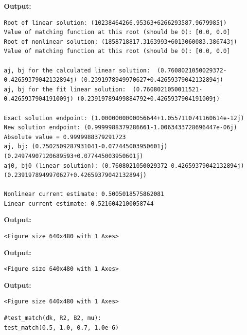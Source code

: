 \documentclass{article}
\begin{document}
\textbf{Output:}\begin{verbatim}
Root of linear solution: (10238464266.95363+6266293587.9679985j)
Value of matching function at this root (should be 0): [0.0, 0.0]
Root of nonlinear solution: (1858718817.3163993+6013060083.386743j)
Value of matching function at this root (should be 0): [0.0, 0.0]

aj, bj for the calculated linear solution:  (0.7608021050029372-0.42659379042132894j) (0.2391978949970627+0.42659379042132894j)
aj, bj for the fit linear solution:  (0.7608021050011521-0.4265937904191009j) (0.23919789499884792+0.4265937904191009j)

Exact solution endpoint: (1.0000000000056644+1.0557110741160614e-12j)
New solution endpoint: (0.9999988379286661-1.0063433728696447e-06j) Absolute value = 0.9999988379291723
aj, bj: (0.7502509287931041-0.077445003950601j) (0.24974907120689593+0.077445003950601j)
aj0, bj0 (linear solution): (0.7608021050029372-0.42659379042132894j) (0.2391978949970627+0.42659379042132894j)

Nonlinear current estimate: 0.5005018575862081
Linear current estimate: 0.5216042100058744

\end{verbatim}

\textbf{Output:}\begin{verbatim}
<Figure size 640x480 with 1 Axes>
\end{verbatim}

\textbf{Output:}\begin{verbatim}
<Figure size 640x480 with 1 Axes>
\end{verbatim}

\textbf{Output:}\begin{verbatim}
<Figure size 640x480 with 1 Axes>
\end{verbatim}

\begin{lstlisting}
#test_match(dk, R2, B2, mu):
test_match(0.5, 1.0, 0.7, 1.0e-6)\end{lstlisting}
\end{document}
